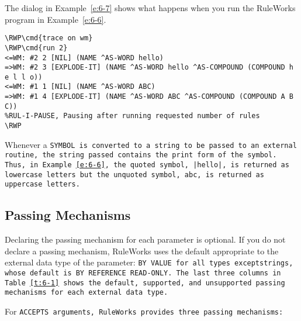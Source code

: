 The dialog in Example~\ref{e:6-7} shows what happens when you run the
RuleWorks program in Example~\ref{e:6-6}.

\begin{exampl}
\begin{Verbatim}[commandchars=\\\{\}]
\RWP\cmd{trace on wm}
\RWP\cmd{run 2}
<=WM: #2 2 [NIL] (NAME ^AS-WORD hello)
=>WM: #2 3 [EXPLODE-IT] (NAME ^AS-WORD hello ^AS-COMPOUND (COMPOUND h e l l o))
<=WM: #1 1 [NIL] (NAME ^AS-WORD ABC)
=>WM: #1 4 [EXPLODE-IT] (NAME ^AS-WORD ABC ^AS-COMPOUND (COMPOUND A B C))
%RUL-I-PAUSE, Pausing after running requested number of rules
\RWP
\end{Verbatim}
\label{e:6-7}
\end{exampl}

\begin{note}
  Whenever a \tt{SYMBOL} is converted to a string to be passed to an
  external routine, the string passed contains the print form of the
  symbol. Thus, in Example~\ref{e:6-6}, the quoted symbol, \verb,|hello|,, is
  returned as lowercase letters but the unquoted symbol, \tt{abc}, is
  returned as uppercase letters.
\end{note}

\subsection{Passing Mechanisms}

Declaring the passing mechanism for each parameter is optional. If you
do not declare a passing mechanism, RuleWorks uses the default
appropriate to the external data type of the parameter: \tt{BY VALUE}
for all types exceptstrings, whose default is \tt{BY REFERENCE
  READ-ONLY}. The last three columns in Table~\ref{t:6-1} shows the
default, supported, and unsupported passing mechanisms for each
external data type.

For \tt{ACCEPTS} arguments, RuleWorks provides three passing
mechanisms:


